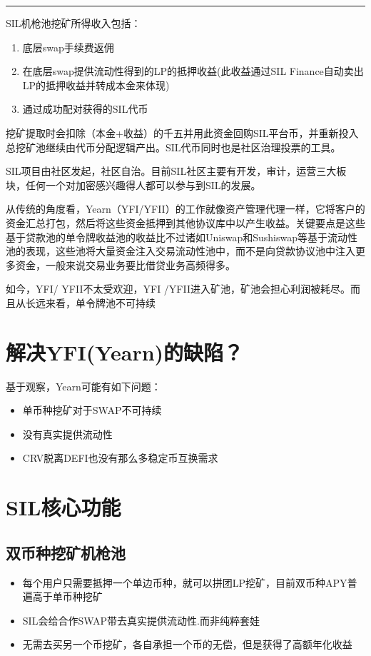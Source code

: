 \documentclass[11pt,letterpaper]{article}
\newcommand{\colorhrule}[3]{\begingroup\color{#1}\rule{#2}{#3}\endgroup}
\begin{document}
\begin{center}
\colorhrule{gris}{16.5cm}{0.7pt}
\end{center}



\begin{multicols}{2}
SIL机枪池挖矿所得收入包括：
\begin{enumerate}
    \item 底层swap手续费返佣
    \item 在底层swap提供流动性得到的LP的抵押收益(此收益通过SIL Finance自动卖出LP的抵押收益并转成本金来体现)
    \item 通过成功配对获得的SIL代币
\end{enumerate}
挖矿提取时会扣除（本金+收益）的千五并用此资金回购SIL平台币，并重新投入总挖矿池继续由代币分配逻辑产出。SIL代币同时也是社区治理投票的工具。

SIL项目由社区发起，社区自治。目前SIL社区主要有开发，审计，运营三大板块，任何一个对加密感兴趣得人都可以参与到SIL的发展。

从传统的角度看，Yearn（YFI/YFII）的工作就像资产管理代理一样，它将客户的资金汇总打包，然后将这些资金抵押到其他协议库中以产生收益。关键要点是这些基于贷款池的单令牌收益池的收益比不过诸如Uniswap和Sushiswap等基于流动性池的表现，这些池将大量资金注入交易流动性池中，而不是向贷款协议池中注入更多资金，一般来说交易业务要比借贷业务高频得多。

如今，YFI/ YFII不太受欢迎，YFI /YFII进入矿池，矿池会担心利润被耗尽。而且从长远来看，单令牌池不可持续

\section{解决YFI(Yearn)的缺陷？}
基于观察，Yearn可能有如下问题：
\begin{itemize}
  \item 单币种挖矿对于SWAP不可持续
  \item 没有真实提供流动性
  \item CRV脱离DEFI也没有那么多稳定币互换需求
\end{itemize}

\section{SIL核心功能}

\subsection{双币种挖矿机枪池}
\begin{itemize}
  \item 每个用户只需要抵押一个单边币种，就可以拼团LP挖矿，目前双币种APY普遍高于单币种挖矿
  \item SIL会给合作SWAP带去真实提供流动性.而非纯粹套娃
  \item 无需去买另一个币挖矿，各自承担一个币的无偿，但是获得了高额年化收益
\end{itemize}


\end{multicols}
\end{document}
